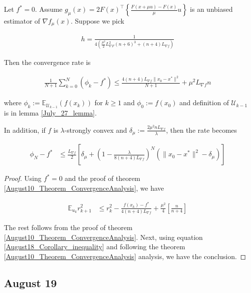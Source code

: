 \documentclass{article}
\begin{document}
\begin{corollary} \label{August18_Theorem_ConvergenceAnalysis}
Let $f^* = 0$. Assume $g_{\mu}(x) = 2F(x)^\top \left\{\frac{F(x+\mu u)-F(x)}{\mu}u\right\}$ is an unbiased estimator of $\nabla f_{\mu}(x)$. Suppose we pick 

\begin{align*}
h = \frac{1}{4\left(\frac{\mu^2}{2}L_{\nabla F}^2(n+6)^3 + (n+4)L_{\nabla f}\right)}
\end{align*}

Then the convergence rate is  

\begin{align}
\frac{1}{N+1}\sum_{k=0}^{N}(\phi_k-f^*) \leq \frac{4(n+4)L_{\nabla f}\|x_0 - x^*\|^2}{N+1} + \mu^2L_{\nabla f}n \label{August18_convergence_analysis_3}
\end{align}

where $\phi_k:= \mathbb{E}_{\mathcal{U}_{k-1}}(f(x_k))$ for $k \geq 1$ and $\phi_0:= f(x_0)$ and definition of $\mathcal{U}_{k-1}$ is in lemma \ref{July_27_lemma}. \newline 

In addition, if $f$ is $\lambda$-strongly convex and $\delta_{\mu}:= \frac{2\mu^2 nL_{\nabla f}}{\lambda}$, then the rate becomes

\begin{align}
\phi_N - f^* & \leq \frac{L_{\nabla f}}{2}\left[\delta_{\mu} + \left(1 - \frac{\lambda}{8(n+4)L_{\nabla f}}\right)^N(\|x_0 - x^*\|^2 - \delta_{\mu})\right]
\end{align}

\begin{proof}
Using $f^* = 0$ and the proof of theorem \ref{August10_Theorem_ConvergenceAnalysis}, we have 

\begin{align}
\mathbb{E}_{u_k}r_{k+1}^2 & \leq r_k^2 - \frac{f(x_k)-f^*}{4(n+4)L_{\nabla f}} + \frac{\mu^2}{4}\left[\frac{n}{n+4}\right] \label{August18_Corollary_inequality}
\end{align}

The rest follows from the proof of theorem \ref{August10_Theorem_ConvergenceAnalysis}. Next, using equation \eqref{August18_Corollary_inequality} and following the theorem \ref{August10_Theorem_ConvergenceAnalysis} analysis, we have the conclusion. 
\end{proof}

\end{corollary}

\subsection{August 19}
\end{document}

